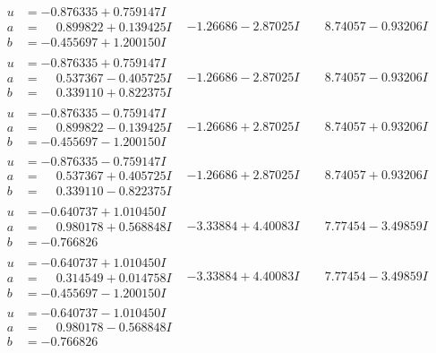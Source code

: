 \documentclass[1p]{elsarticle_modified}
\theoremstyle{definition}
\begin{document}
$$\begin{array}{c|c|c}
\begin{aligned}
u &= -0.876335 + 0.759147 I \\
a &= \phantom{-}0.899822 + 0.139425 I \\
b &= -0.455697 + 1.200150 I\end{aligned}
 & -1.26686 - 2.87025 I & \phantom{-}8.74057 - 0.93206 I \\ \hline\begin{aligned}
u &= -0.876335 + 0.759147 I \\
a &= \phantom{-}0.537367 - 0.405725 I \\
b &= \phantom{-}0.339110 + 0.822375 I\end{aligned}
 & -1.26686 - 2.87025 I & \phantom{-}8.74057 - 0.93206 I \\ \hline\begin{aligned}
u &= -0.876335 - 0.759147 I \\
a &= \phantom{-}0.899822 - 0.139425 I \\
b &= -0.455697 - 1.200150 I\end{aligned}
 & -1.26686 + 2.87025 I & \phantom{-}8.74057 + 0.93206 I \\ \hline\begin{aligned}
u &= -0.876335 - 0.759147 I \\
a &= \phantom{-}0.537367 + 0.405725 I \\
b &= \phantom{-}0.339110 - 0.822375 I\end{aligned}
 & -1.26686 + 2.87025 I & \phantom{-}8.74057 + 0.93206 I \\ \hline\begin{aligned}
u &= -0.640737 + 1.010450 I \\
a &= \phantom{-}0.980178 + 0.568848 I \\
b &= -0.766826\phantom{ +0.000000I}\end{aligned}
 & -3.33884 + 4.40083 I & \phantom{-}7.77454 - 3.49859 I \\ \hline\begin{aligned}
u &= -0.640737 + 1.010450 I \\
a &= \phantom{-}0.314549 + 0.014758 I \\
b &= -0.455697 - 1.200150 I\end{aligned}
 & -3.33884 + 4.40083 I & \phantom{-}7.77454 - 3.49859 I \\ \hline\begin{aligned}
u &= -0.640737 - 1.010450 I \\
a &= \phantom{-}0.980178 - 0.568848 I \\
b &= -0.766826\phantom{ +0.000000I}\end{aligned}

\end{array}$$
\end{document}
